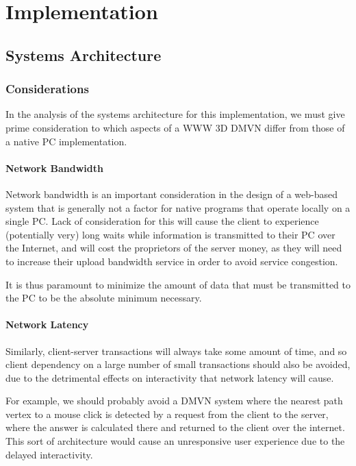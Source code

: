 
\chapter{Implementation}


\section{Systems Architecture}

\subsection {Considerations}
In the analysis of the systems architecture for this implementation, we must give prime consideration to which aspects of a WWW 3D DMVN differ from those of a native PC implementation.

\subsubsection{Network Bandwidth}
Network bandwidth is an important consideration in the design of a web-based system that is generally not a factor for native programs that operate locally on a single PC. Lack of consideration for this will cause the client to experience (potentially very) long waits while information is transmitted to their PC over the Internet, and will cost the proprietors of the server money, as they will need to increase their upload bandwidth service in order to avoid service congestion.
\par It is thus paramount to minimize the amount of data that must be transmitted to the PC to be the absolute minimum necessary.

\subsubsection{Network Latency}
Similarly, client-server transactions will always take some amount of time, and so client dependency on a large number of small transactions should also be avoided, due to the detrimental effects on interactivity that network latency will cause.
\par For example, we should probably avoid a DMVN system where the nearest path vertex to a mouse click is detected by a request from the client to the server, where the answer is calculated there and returned to the client over the internet. This sort of architecture would cause an unresponsive user experience due to the delayed interactivity.

